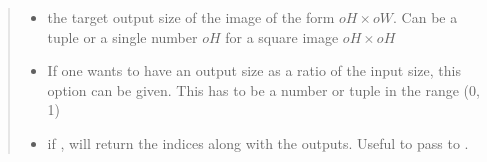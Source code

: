 \documentclass[letterpaper,10pt,english]{sphinxmanual}
\begin{document}
\begin{fulllineitems}
\begin{fulllineitems}
\begin{quote}
\begin{description}
\begin{itemize}
\item {} 
\sphinxAtStartPar
{} \textendash{} the target output size of the image of the form \(oH \times oW\).
Can be a tuple  or a single number \(oH\) for a square image \(oH \times oH\)

\item {} 
\sphinxAtStartPar
{} \textendash{} If one wants to have an output size as a ratio of the input size, this option can be given.
This has to be a number or tuple in the range (0, 1)

\item {} 
\sphinxAtStartPar
{} \textendash{} if , will return the indices along with the outputs.
Useful to pass to .

\end{itemize}

\end{description}\end{quote}
\begin{description}
\begin{sphinxVerbatim}[commandchars=\\\{\}]
     
   
   
\end{sphinxVerbatim}

\end{description}


\end{fulllineitems}
\end{fulllineitems}
\end{document}
